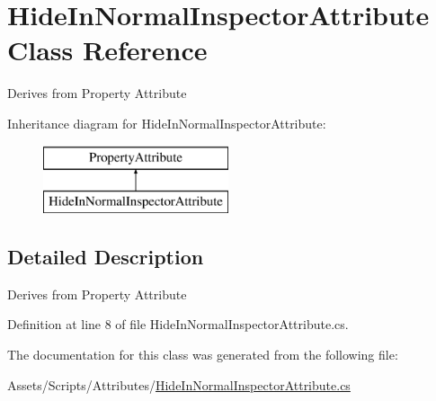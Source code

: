 \hypertarget{class_hide_in_normal_inspector_attribute}{}\section{Hide\+In\+Normal\+Inspector\+Attribute Class Reference}
\label{class_hide_in_normal_inspector_attribute}


Derives from Property Attribute  


Inheritance diagram for Hide\+In\+Normal\+Inspector\+Attribute\+:\begin{figure}[H]
\begin{center}
\leavevmode
\includegraphics[height=2.000000cm]{class_hide_in_normal_inspector_attribute}
\end{center}
\end{figure}


\subsection{Detailed Description}
Derives from Property Attribute 



Definition at line 8 of file Hide\+In\+Normal\+Inspector\+Attribute.\+cs.



The documentation for this class was generated from the following file\+:\begin{DoxyCompactItemize}
\item 
Assets/\+Scripts/\+Attributes/\mbox{\hyperlink{_hide_in_normal_inspector_attribute_8cs}{Hide\+In\+Normal\+Inspector\+Attribute.\+cs}}\end{DoxyCompactItemize}
